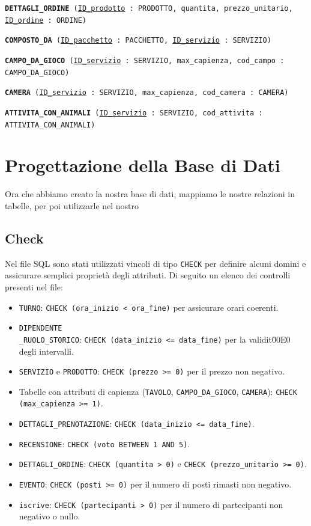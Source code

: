 \documentclass[a4paper,12pt]{report}
\begin{document}
\begin{description}
	\item\texttt{\textbf{DETTAGLI\_ORDINE} (\underline{ID\_prodotto} : PRODOTTO, quantita, prezzo\_unitario, \newline \underline{ID\_ordine} : ORDINE)}
	\item\texttt{\textbf{COMPOSTO\_DA} (\underline{ID\_pacchetto} : PACCHETTO, \underline{ID\_servizio} : SERVIZIO)}
	\item\texttt{\textbf{CAMPO\_DA\_GIOCO} (\underline{ID\_servizio} : SERVIZIO, max\_capienza, \newline cod\_campo : CAMPO\_DA\_GIOCO)}
	\item\texttt{\textbf{CAMERA} (\underline{ID\_servizio} : SERVIZIO, max\_capienza, cod\_camera : CAMERA)}
	\item\texttt{\textbf{ATTIVITA\_CON\_ANIMALI} (\underline{ID\_servizio} : SERVIZIO, \newline cod\_attivita : ATTIVITA\_CON\_ANIMALI)}
\end{description}

\chapter{Progettazione della Base di Dati}
Ora che abbiamo creato la nostra base di dati, mappiamo le nostre relazioni in tabelle, per poi utilizzarle nel nostro

\section{Check}
Nel file SQL sono stati utilizzati vincoli di tipo \texttt{CHECK} per definire alcuni domini e assicurare semplici proprietà degli attributi. Di seguito un elenco dei controlli presenti nel file:
\begin{itemize}
\item \texttt{TURNO}: \texttt{CHECK (ora\_inizio < ora\_fine)} per assicurare orari coerenti.
\item \texttt{DIPENDENTE\\\_RUOLO\_STORICO}: \texttt{CHECK (data\_inizio <= data\_fine)} per la validit\u00E0 degli intervalli.
\item \texttt{SERVIZIO} e \texttt{PRODOTTO}: \texttt{CHECK (prezzo >= 0)} per il prezzo non negativo.
\item Tabelle con attributi di capienza (\texttt{TAVOLO}, \texttt{CAMPO\_DA\_GIOCO}, \texttt{CAMERA}): \texttt{CHECK (max\_capienza >= 1)}.
\item \texttt{DETTAGLI\_PRENOTAZIONE}: \texttt{CHECK (data\_inizio <= data\_fine)}.
\item \texttt{RECENSIONE}: \texttt{CHECK (voto BETWEEN 1 AND 5)}.
\item \texttt{DETTAGLI\_ORDINE}: \texttt{CHECK (quantita > 0)} e \texttt{CHECK (prezzo\_unitario >= 0)}.
\item \texttt{EVENTO}: \texttt{CHECK (posti >= 0)} per il numero di posti rimasti non negativo.
\item \texttt{iscrive}: \texttt{CHECK (partecipanti > 0)} per il numero di partecipanti non negativo o nullo.
\end{itemize}
\end{document}
